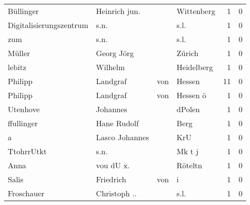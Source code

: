\documentclass[10pt,a4paper,landscape]{article}
\begin{document}
\begin{longtable}{llllrr}
                Büllinger &                      Heinrich jun. &             &                                  Wittenberg &          1 &         0 \\
  Digitalisierungszentrum &                               s.n. &             &                                        s.l. &          1 &         0 \\
                      zum &                               s.n. &             &                                        s.l. &          1 &         0 \\
                   Müller &                         Georg Jörg &             &                                      Zürich &          1 &         0 \\
                   lebitz &                            Wilhelm &             &                                  Heidelberg &          1 &         0 \\
                  Philipp &                           Landgraf &         von &                                      Hessen &         11 &         0 \\
                  Philipp &                           Landgraf &         von &                                    Hessen ö &          1 &         0 \\
                 Utenhove &                           Johannes &             &                                      dPolen &          1 &         0 \\
               ffullinger &                        Hane Rudolf &             &                                        Berg &          1 &         0 \\
                        a &                     Lasco Johannes &             &                                         KrU &          1 &         0 \\
               TtohrrUtkt &                               s.n. &             &                                      Mk t j &          1 &         0 \\
                     Anna &                          vou dU x. &             &                                     Röteltn &          1 &         0 \\
                    Salis &                          Friedrich &         von &                                           i &          1 &         0 \\
               Froschauer &                       Christoph .. &             &                                        s.l. &          1 &         0 \\

\end{longtable}
\end{document}
